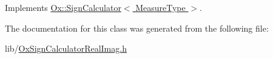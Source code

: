 Implements \hyperlink{class_ox_1_1_sign_calculator_a40d9d97a505a69b687429bf545597687}{Ox\-::\-Sign\-Calculator$<$ Measure\-Type $>$}.



The documentation for this class was generated from the following file\-:\begin{DoxyCompactItemize}
\item 
lib/\hyperlink{_ox_sign_calculator_real_imag_8h}{Ox\-Sign\-Calculator\-Real\-Imag.\-h}\end{DoxyCompactItemize}
